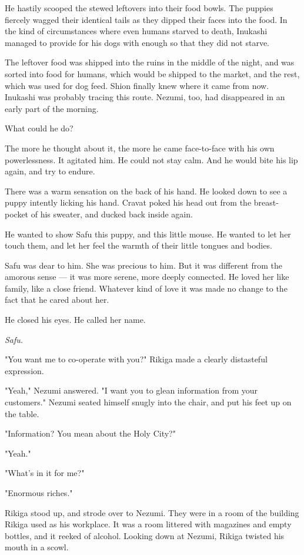 He hastily scooped the stewed leftovers into their food bowls. The
puppies fiercely wagged their identical tails as they dipped their faces
into the food. In the kind of circumstances where even humans starved to
death, Inukashi managed to provide for his dogs with enough so that they
did not starve.

The leftover food was shipped into the ruins in the middle of the night,
and was sorted into food for humans, which would be shipped to the
market, and the rest, which was used for dog feed. Shion finally knew
where it came from now. Inukashi was probably tracing this route.
Nezumi, too, had disappeared in an early part of the morning.

What could he do?

The more he thought about it, the more he came face-to-face with his own
powerlessness. It agitated him. He could not stay calm. And he would
bite his lip again, and try to endure.

There was a warm sensation on the back of his hand. He looked down to
see a puppy intently licking his hand. Cravat poked his head out from
the breast-pocket of his sweater, and ducked back inside again.

He wanted to show Safu this puppy, and this little mouse. He wanted to
let her touch them, and let her feel the warmth of their little tongues
and bodies.

Safu was dear to him. She was precious to him. But it was different from
the amorous sense --- it was more serene, more deeply connected. He loved
her like family, like a close friend. Whatever kind of love it was made
no change to the fact that he cared about her.

He closed his eyes. He called her name.

\emph{Safu.}

\mybreak

"You want me to co-operate with you?" Rikiga made a clearly distasteful
expression.

"Yeah," Nezumi answered. "I want you to glean information from your
customers." Nezumi seated himself snugly into the chair, and put his
feet up on the table.

"Information? You mean about the Holy City?"

"Yeah."

"What's in it for me?"

"Enormous riches."

Rikiga stood up, and strode over to Nezumi. They were in a room of the
building Rikiga used as his workplace. It was a room littered with
magazines and empty bottles, and it reeked of alcohol. Looking down at
Nezumi, Rikiga twisted his mouth in a scowl.

